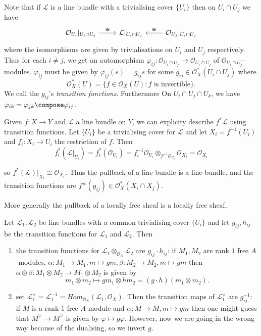 \documentclass[a4paper]{article}
\newcommand{\sh}[1]{\mathcal{#1}} %
\begin{document}
\begin{eg}
  Note that if \(\sh L\) is a line bundle with a trivialising cover \(\{U_i\}\) then on \(U_i \cap U_j\) we have
  \[
    \begin{tikzcd}
      \sh O_{U_i}|_{U_i \cap U_j} \ar[r, "\cong"] & \sh L|_{U_i \cap U_j} & \sh O_{U_j}|_{U_i \cap U_j} \ar[l, "\cong"']
    \end{tikzcd}
  \]
  where the isomorphisms are given by trivialisations on \(U_i\) and \(U_j\) respectively. Thus for each \(i \neq j\), we get an automorphism \(\varphi_{ij}: \sh O_{U_i \cap U_j} \to \sh O_{U_i \cap U_j}\) of \(\sh O_{U_i \cap U_j}\)-modules. \(\varphi_{ij}\) must be given by \(\varphi_{ij}(s) = g_{ij} s\) for some \(g_{ij} \in \sh O_X^*(U_i \cap U_j)\) where
  \[
    \sh O_X^*(U) = \{f \in \sh O_X(U): f \text{ is invertible}\}.
  \]
  We call the \(g_{ij}\)'s \emph{transition functions}. Furthermore On \(U_i \cap U_j \cap U_k\), we have \(\varphi_{ik} = \varphi_{jk} \compose \varphi_{ij}\).

  Given \(f: X \to Y\) and \(\sh L\) a line bundle on \(Y\), we can explicity describe \(f^* \sh L\) using transition functions. Let \(\{U_i\}\) be a trivialising cover for \(\sh L\) and let \(X_i = f^{-1}(U_i)\) and \(f_i: X_i \to U_i\) the restriction of \(f\). Then
  \[
    f_i^*(\sh L|_{U_i}) = f_i^*(\sh O_{U_i}) = f_i^{-1} \sh O_{U_i} \otimes_{f^{-1} \sh O_{U_i}} \sh O_{X_i} = \sh O_{X_i}
  \]

  so \(f^*(\sh L)|_{X_i} \cong \sh O_{X_i}\). Thus the pullback of a line bundle is a line bundle, and the transition functions are \(f^\#(g_{ij}) \in \sh O_X^*(X_i \cap X_j)\).

  More generally the pullback of a locally free sheaf is a locally free sheaf.
\end{eg}

\begin{eg}
  Let \(\sh L_1, \sh L_2\) be line bundles with a common trivialising cover \(\{U_i\}\) and let \(g_{ij}, h_{ij}\) be the transition functions for \(\sh L_1\) and \(\sh L_2\). Then
  \begin{enumerate}
  \item the transition functions for \(\sh L_1 \otimes_{\sh O_X} \sh L_2\) are \(g_{ij} \cdot h_{ij}\): if \(M_1, M_2\) are rank \(1\) free \(A\)-modules, \(\alpha: M_1\to M_1, m \mapsto gm, \beta: M_2 \to M_2, m \mapsto gm\) then \(\alpha \otimes \beta: M_1 \otimes M_2 \to M_1 \otimes M_2\) is given by
    \[
      m_1 \otimes m_2 \mapsto gm_1 \otimes hm_2 = (g\cdot h)(m_1 \otimes m_2).
    \]
  \item set \(\sh L_1^\vee = \sh L_1^{-1} = Hom_{\sh O_X}(\sh L_1, \sh O_X)\). Then the transition maps of \(\sh L_1^\vee\) are \(g_{ij}^{-1}\): if \(M\) is a rank \(1\) free \(A\)-module and \(\alpha: M \to M, m \mapsto gm\) then one might guess that \(M^\vee \to M^\vee\) is given by \(\varphi \mapsto g \varphi\). However, now we are going in the wrong way because of the dualising, so we invert \(g\).
  \end{enumerate}
\end{eg}
\end{document}

